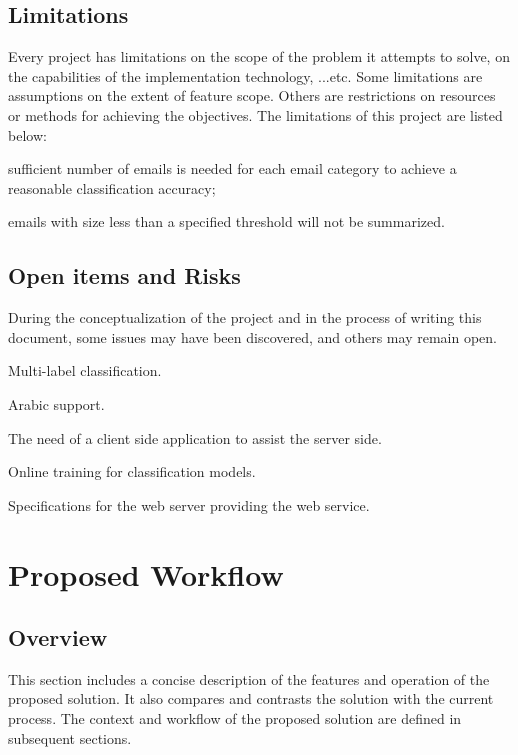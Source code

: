 \documentclass[a4paper,10pt]{article}
\newenvironment{my_itemize}
{\begin{itemize}
  \setlength{\itemsep}{0cm}
  \setlength{\parskip}{0cm}}
{\end{itemize}}
\begin{document}
\subsection{Limitations}
Every project has limitations on the scope of the problem it attempts to solve, 
on the capabilities of the implementation technology, ...etc. Some limitations 
are assumptions on the extent of feature scope. Others are restrictions on resources 
or methods for achieving the objectives. The limitations of this project are listed below:

\begin{my_itemize}
  \item sufficient number of emails is needed for each email category to achieve 
	a reasonable classification accuracy;
  \item emails with size less than a specified threshold will not be summarized.
\end{my_itemize}

\subsection{Open items and Risks}
During the conceptualization of the project and in the process of writing this document, 
some issues may have been discovered, and others may remain open.
\begin{my_itemize}
  \item Multi-label classification.
  \item Arabic support.
  \item The need of a client side application to assist the server side.
  \item Online training for classification models.
  \item Specifications for the web server providing the web service.
\end{my_itemize}


\section{Proposed Workflow}
\subsection{Overview}
This section includes a concise description of the features and operation of the 
proposed solution. It also compares and contrasts the solution with the current 
process. The context and workflow of the proposed solution are defined in subsequent sections.
\end{document}
